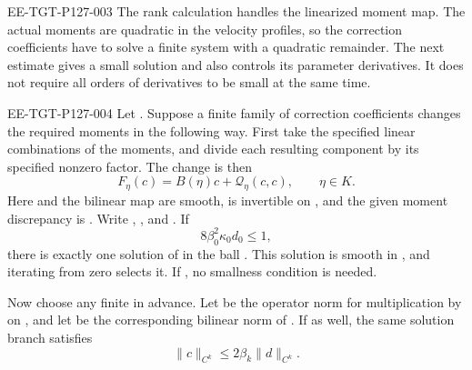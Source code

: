 \begin{EESegment}{EE-TGT-P127-003}
The rank calculation handles the linearized moment map. The actual moments are quadratic
in the velocity profiles, so the correction coefficients have to solve a finite system with a
quadratic remainder. The next estimate gives a small solution and also controls its
parameter derivatives. It does not require all orders of derivatives to be small at the same
time.
\end{EESegment}

\begin{lemma}\label{lem:A.2}
\begin{EESegment}{EE-TGT-P127-004}
Let . Suppose a finite family of correction coefficients
 changes the required moments in the following way. First
take the specified linear combinations of the moments, and divide each resulting component
by its specified nonzero factor. The change is then
\begin{equation}
F_\eta(c)=B(\eta)c+\mathcal Q_\eta(c,c),
\qquad \eta\in K.
\tag{A.2}\label{eq:A.2}
\end{equation}
Here  and the bilinear map
 are smooth,
 is invertible on , and the given
moment discrepancy is . Write
,
, and
. If
\[
8\beta_0^2\kappa_0d_0\le1,
\]
there is exactly one solution of  in the ball
. This solution is smooth in
, and iterating
 from zero
selects it. If , no smallness condition is needed.

Now choose any finite  in advance. Let
 be the operator norm for multiplication by
 on , and let
 be the corresponding bilinear norm of
. If
 as well, the same
solution branch satisfies
\begin{equation}
\lVert c\rVert_{C^k}\le2\beta_k\lVert d\rVert_{C^k}.
\tag{A.3}\label{eq:A.3}
\end{equation}
\end{EESegment}
\end{lemma}

